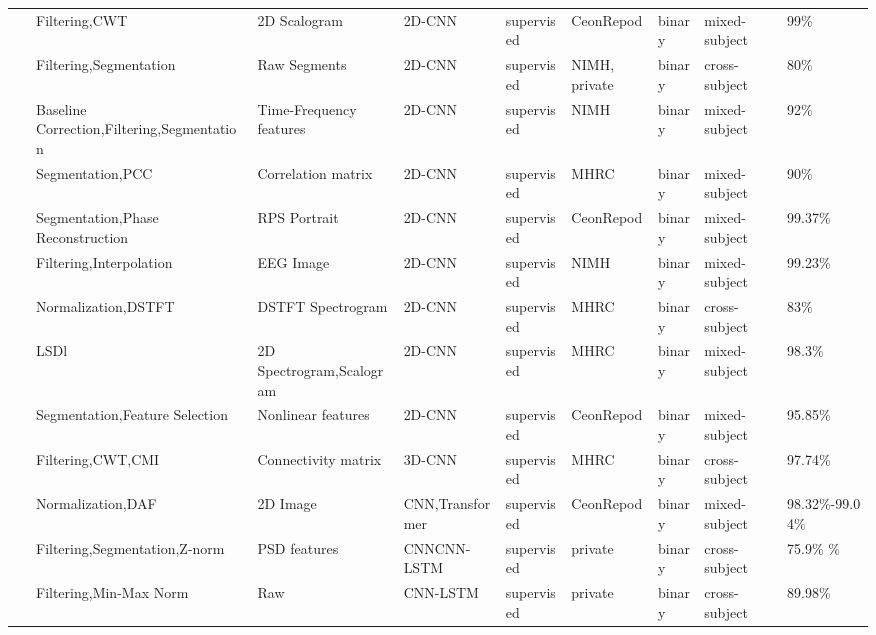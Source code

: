 \begin{table*}[ht]
\begin{tabular}{p{0.4cm}p{2.8cm}p{2cm}p{1.5cm}p{1.9cm}p{1.9cm}p{0.8cm}p{1.8cm}p{2cm}}
~\cite{SZ22} & Filtering,CWT & 2D Scalogram & 2D-CNN & supervised & CeonRepod & binary & mixed-subject & 99\% \\
~\cite{SZ23} & Filtering,Segmentation & Raw Segments & 2D-CNN & supervised & NIMH, \newline private & binary & cross-subject & 80\% \\
~\cite{SZ24} & Baseline Correction,\newline Filtering,Segmentation & Time-Frequency features & 2D-CNN & supervised & NIMH & binary & mixed-subject & 92\% \\
~\cite{SZ25} & Segmentation,PCC & Correlation \newline matrix & 2D-CNN & supervised & MHRC & binary & mixed-subject & 90\% \\
~\cite{SZ26} & Segmentation,Phase \newline Reconstruction & RPS Portrait & 2D-CNN & supervised & CeonRepod & binary & mixed-subject & 99.37\% \\
~\cite{SZ27} & Filtering,Interpolation & EEG Image & 2D-CNN & supervised & NIMH & binary & mixed-subject & 99.23\% \\
~\cite{SZ28} & Normalization,DSTFT & DSTFT \newline Spectrogram & 2D-CNN & supervised & MHRC & binary & cross-subject & 83\% \\
~\cite{SZ29} & LSDl & 2D Spectrogram,\newline Scalogram & 2D-CNN & supervised & MHRC & binary & mixed-subject & 98.3\% \\
~\cite{SZ30} & Segmentation,Feature Selection & Nonlinear features & 2D-CNN & supervised & CeonRepod & binary & mixed-subject & 95.85\% \\
~\cite{SZ31} & Filtering,CWT,CMI & Connectivity \newline matrix & 3D-CNN & supervised & MHRC & binary & cross-subject & 97.74\% \\
~\cite{SZ32} & Normalization,DAF & 2D Image & CNN,\newline Transformer & supervised & CeonRepod & binary & mixed-subject & 98.32\%-99.04\% \\
~\cite{SZ33} & Filtering,Segmentation,\newline Z-norm & PSD features & CNN\newline CNN-LSTM & supervised & private & binary & cross-subject & 75.9\% \newline 71.5\%
 \\
~\cite{SZ34} & Filtering,Min-Max Norm & Raw & CNN-LSTM & supervised & private & binary & cross-subject & 89.98\% \\
\hline
\end{tabular}
\end{table*}

